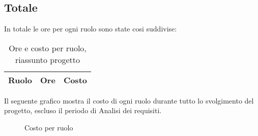 \subsection{Totale}

In totale le ore per ogni ruolo sono state cosi suddivise:

\begin{table}[H]
	\centering
	\begin{tabular}{ l c c }
	\textbf{Ruolo} & \textbf{Ore} & \textbf{Costo} \\
	\hline
	
		
	
	\end{tabular}
	\caption{Ore e costo per ruolo, riassunto progetto}
	\end{table}

Il seguente grafico mostra il costo di ogni ruolo durante tutto lo svolgimento del progetto, escluso il periodo di Analisi dei requisiti.

\begin{figure}[H]
\begin{tikzpicture}

	

\end{tikzpicture}
\caption{Costo per ruolo}
\end{figure}